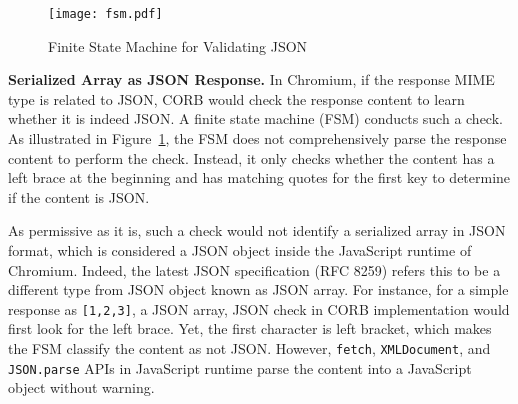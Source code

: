 \documentclass[10pt,conference]{IEEEtran}
\begin{document}
\begin{figure} [t] \small
    \centering
    \texttt{[image: fsm.pdf]}
    \caption{Finite State Machine for Validating JSON}
    \label{fig: json fsm}

\end{figure}


\textbf{Serialized Array as JSON Response.} In Chromium, if the response MIME type is related to JSON, CORB would check the response content to learn whether it is indeed JSON. A finite state machine (FSM) conducts such a check. As illustrated in Figure~\ref{fig: json fsm}, the FSM does not comprehensively parse the response content to perform the check. Instead, it only checks whether the content has a left brace at the beginning and has matching quotes for the first key to determine if the content is JSON.

As permissive as it is, such a check would not identify a serialized array in JSON format, which is considered a JSON object inside the JavaScript runtime of Chromium. Indeed, the latest JSON specification (RFC 8259\cite{ietf_tools}) refers this to be a different type from JSON object known as JSON array. For instance, for a simple response as \verb|[1,2,3]|, a JSON array, JSON check in CORB implementation would first look for the left brace. Yet, the first character is left bracket, which makes the FSM classify the content as not JSON. %
However, \verb|fetch|, \verb|XMLDocument|, and \verb|JSON.parse| APIs in JavaScript runtime  parse the content into a JavaScript object without warning.
\end{document}
